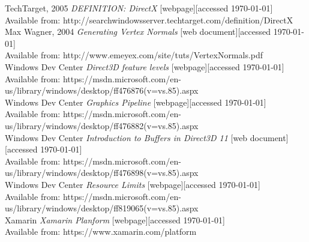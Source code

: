 \documentclass[twoside, english, 11pt]{report}
\begin{document}
\small TechTarget, 2005 \textit{DEFINITION: DirectX} [webpage][accessed \today] \\
Available from: http://searchwindowsserver.techtarget.com/definition/DirectX\\

\small Max Wagner, 2004 \textit{Generating Vertex Normals} [web document][accessed \today] \\
Available from: http://www.emeyex.com/site/tuts/VertexNormals.pdf\\

\small Windows Dev Center \textit{Direct3D feature levels} [webpage][accessed \today] \\
Available from: https://msdn.microsoft.com/en-us/library/windows/desktop/ff476876(v=vs.85).aspx\\

\small Windows Dev Center \textit{Graphics Pipeline} [webpage][accessed \today] \\
Available from: https://msdn.microsoft.com/en-us/library/windows/desktop/ff476882(v=vs.85).aspx\\

\small Windows Dev Center \textit{Introduction to Buffers in Direct3D 11} [web document][accessed \today] \\
Available from: https://msdn.microsoft.com/en-us/library/windows/desktop/ff476898(v=vs.85).aspx\\

\small Windows Dev Center \textit{Resource Limits } [webpage][accessed \today] \\
Available from: https://msdn.microsoft.com/en-us/library/windows/desktop/ff819065(v=vs.85).aspx\\

\small Xamarin \textit{Xamarin Planform} [webpage][accessed \today] \\
Available from: https://www.xamarin.com/platform\\
\end{document}
